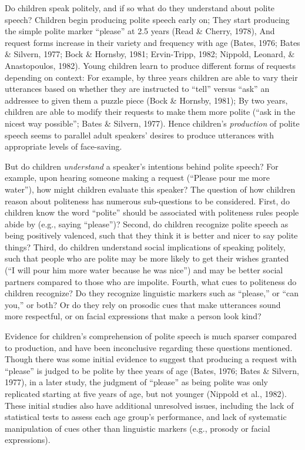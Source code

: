 \documentclass[10pt, letterpaper]{article}
\begin{document}
Do children speak politely, and if so what do they understand about
polite speech? Children begin producing polite speech early on; They
start producing the simple polite marker ``please'' at 2.5 years (Read
\& Cherry, 1978), And request forms increase in their variety and
frequency with age (Bates, 1976; Bates \& Silvern, 1977; Bock \&
Hornsby, 1981; Ervin-Tripp, 1982; Nippold, Leonard, \& Anastopoulos,
1982). Young children learn to produce different forms of requests
depending on context: For example, by three years children are able to
vary their utterances based on whether they are instructed to ``tell''
versus ``ask'' an addressee to given them a puzzle piece (Bock \&
Hornsby, 1981); By two years, children are able to modify their requests
to make them more polite (``ask in the nicest way possible''; Bates \&
Silvern, 1977). Hence children's \emph{production} of polite speech
seems to parallel adult speakers' desires to produce utterances with
appropriate levels of face-saving.

But do children \emph{understand} a speaker's intentions behind polite
speech? For example, upon hearing someone making a request (``Please
pour me more water''), how might children evaluate this speaker? The
question of how children reason about politeness has numerous
sub-questions to be considered. First, do children know the word
``polite'' should be associated with politeness rules people abide by
(e.g., saying ``please'')? Second, do children recognize polite speech
as being positively valenced, such that they think it is better and
nicer to say polite things? Third, do children understand social
implications of speaking politely, such that people who are polite may
be more likely to get their wishes granted (``I will pour him more water
because he was nice'') and may be better social partners compared to
those who are impolite. Fourth, what cues to politeness do children
recognize? Do they recognize linguistic markers such as ``please,'' or
``can you,'' or both? Or do they rely on prosodic cues that make
utterances sound more respectful, or on facial expressions that make a
person look kind?

Evidence for children's comprehension of polite speech is much sparser
compared to production, and have been inconclusive regarding these
questions mentioned. Though there was some initial evidence to suggest
that producing a request with ``please'' is judged to be polite by thee
years of age (Bates, 1976; Bates \& Silvern, 1977), in a later study,
the judgment of ``please'' as being polite was only replicated starting
at five years of age, but not younger (Nippold et al., 1982). These
initial studies also have additional unresolved issues, including the
lack of statistical tests to assess each age group's performance, and
lack of systematic manipulation of cues other than linguistic markers
(e.g., prosody or facial expressions).
\end{document}
